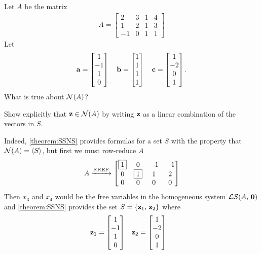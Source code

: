 \documentclass{ximera}
\author{Robert Beezer}
\begin{document}
\begin{exercise}
  Let $A$ be the matrix
  \begin{align*}
    A=
    \begin{bmatrix}
      2 & 3 & 1 & 4 \\
      1 & 2 & 1 & 3 \\
      -1 & 0 & 1 & 1
    \end{bmatrix}
  \end{align*}
  Let
  \[
    \mathbf{a} = \begin{bmatrix}1\\-1\\1\\0\end{bmatrix} \quad
    \mathbf{b} = \begin{bmatrix}1\\1\\1\\1\end{bmatrix} \quad
    \mathbf{c} = \begin{bmatrix}1\\-2\\0\\1\end{bmatrix}.
  \]
  What is true about $\mathcal{N}\!\left(A\right)$?

  \begin{multipleChoice}
  \end{multipleChoice}
  Show explicitly that $\mathbf{z}\in\mathcal{N}\!\left(A\right)$ by writing $\mathbf{z}$ as a linear combination of the vectors in $S$.

  \begin{feedback}[correct]
    Indeed, \ref{theorem:SSNS} provides formulas for a set $S$ with the property that $\mathcal{N}\!\left(A\right) = \left\langle S\right\rangle$, but first we must row-reduce $A$
    \[
      A\xrightarrow{\text{RREF}}
      \begin{bmatrix}
        \fbox{1} & 0 & -1 & -1 \\
        0 & \fbox{1} & 1 & 2 \\
        0 & 0 & 0 & 0
      \end{bmatrix}
    \]
    Then $x_3$ and $x_4$ would be the free variables in the homogeneous system $\mathcal{LS}\!\left(A,\,\mathbf{0}\right)$ and \ref{theorem:SSNS} provides the set $S=\left\{\mathbf{z}_1,\,\mathbf{z}_2\right\}$ where
    \begin{align*}
      \mathbf{z}_1
      &=
        \begin{bmatrix}1\\-1\\1\\0\end{bmatrix}
      &
        \mathbf{z}_2
      &=
        \begin{bmatrix}1\\-2\\0\\1\end{bmatrix}
    \end{align*}
  \end{feedback}


\end{exercise}
\end{document}

